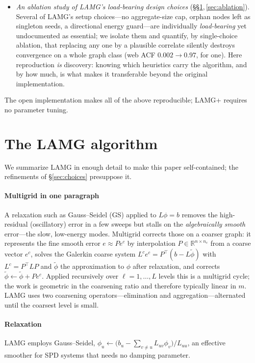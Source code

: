 \documentclass[leqno,letterpaper]{etna}
\newcommand{\R}{\mathbb{R}}
\begin{document}
\begin{itemize}[leftmargin=1.4em,itemsep=1pt]
\item \emph{An ablation study of LAMG's load-bearing design choices} (\S\S\ref{sec:alg},\,\ref{sec:ablation}).
Several of LAMG's setup choices---no aggregate-size cap, orphan nodes left as singleton seeds, a
directional energy guard---are individually \emph{load-bearing} yet undocumented as essential; we
isolate them and quantify, by single-choice ablation, that replacing any one by a plausible correlate
silently destroys convergence on a whole graph class (web ACF $0.002\!\to\!0.97$, for one). Here
reproduction \emph{is} discovery: knowing which heuristics carry the algorithm, and by how much, is
what makes it transferable beyond the original implementation.
\end{itemize}
The open implementation makes all of the above reproducible; LAMG+ requires no parameter tuning.

\section{The LAMG algorithm}\label{sec:alg}
We summarize LAMG \cite{lamg} in enough detail to make this paper self-contained; the
refinements of \S\ref{sec:choices} presuppose it.

\paragraph{Multigrid in one paragraph} A relaxation such as Gauss--Seidel (GS) applied to
$L\phi=b$ removes the high-residual (oscillatory) error in a few sweeps but stalls on the
\emph{algebraically smooth} error---the slow, low-energy modes. Multigrid corrects those
on a coarser graph: it represents the fine smooth error $e\approx Pe^c$ by interpolation
$P\in\R^{n\times n_c}$ from a coarse vector $e^c$, solves the Galerkin coarse system
$L^c e^c=P^{\top}(b-L\tilde\phi)$ with $L^c=P^{\top}LP$ and $\tilde\phi$ the approximation to $\phi$ after relaxation, and corrects
$\tilde\phi\leftarrow\tilde\phi+Pe^c$. Applied recursively over $\ell=1,\dots,L$ levels
this is a multigrid cycle; the work is geometric in the coarsening ratio and therefore typically linear in $m$.
LAMG uses two coarsening operators---elimination and aggregation---alternated until the
coarsest level is small.

\paragraph{Relaxation} LAMG employs Gauss--Seidel,
$\phi_u\leftarrow\big(b_u-\sum_{v\neq u}L_{uv}\phi_v\big)/L_{uu}$, an effective smoother
for SPD systems that needs no damping parameter.
\end{document}

